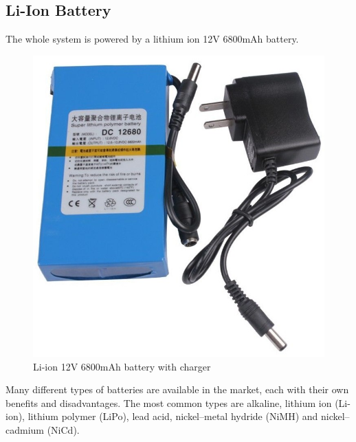 \subsection{Li-Ion Battery}

	The whole system is powered by a lithium ion 12V 6800mAh battery. 

		\begin{figure}[H]
				\centering
				\includegraphics[scale=0.25]{images/ProjectComponents/battery.jpg}
				\caption{Li-ion 12V 6800mAh battery with charger}
				\label{}
		\end{figure}
		\bigskip

	Many different types of batteries are available in the market, each with their own benefits and disadvantages. The most common types are alkaline, lithium ion (Li-ion), lithium polymer (LiPo), lead acid, nickel–metal hydride (NiMH) and  nickel–cadmium (NiCd).

